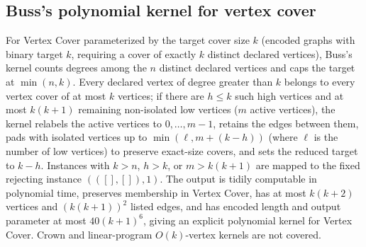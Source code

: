 \begin{result}
\subsection{Buss's polynomial kernel for vertex cover}
For Vertex Cover parameterized by the target cover size $k$ (encoded graphs with binary target
$k$, requiring a cover of exactly $k$ distinct declared vertices), Buss's kernel counts degrees
among the $n$ distinct declared vertices and caps the target at $\min(n,k)$. Every declared vertex
of degree greater than $k$ belongs to every vertex cover of at most $k$ vertices; if there are
$h\le k$ such high vertices and at most $k(k+1)$ remaining non-isolated low vertices ($m$ active
vertices), the kernel relabels the active vertices to $0,\dots,m-1$, retains the edges between
them, pads with isolated vertices up to $\min(\ell,m+(k-h))$ (where $\ell$ is the number of low
vertices) to preserve exact-size covers, and sets the reduced target to $k-h$. Instances with
$k>n$, $h>k$, or $m>k(k+1)$ are mapped to the fixed rejecting instance $(([],[]),1)$. The output
is tidily computable in polynomial time, preserves membership in Vertex Cover, has at most
$k(k+2)$ vertices and $(k(k+1))^2$ listed edges, and has encoded length and output parameter at
most $40(k+1)^6$, giving an explicit polynomial kernel for Vertex Cover. Crown and linear-program
$O(k)$-vertex kernels are not covered.
\citep{BussGoldsmith1993,DowneyFellows1999,FlumGrohe2006,CyganEtAl2015}

\end{result}
